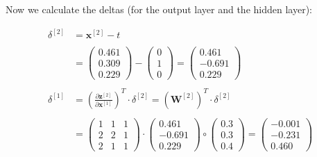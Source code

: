 \documentclass[12pt]{article}
\begin{document}
\begin{enumerate}
\newpage
Now we calculate the deltas (for the output layer and the hidden layer):

\begin{equation*}
    \begin{aligned}
        \delta^{[2]} &= \mathbf{x}^{[2]} - t\\
        \\
        &= \begin{pmatrix} 
            0.461 \\
            0.309 \\
            0.229
            \end{pmatrix} -
            \begin{pmatrix} 
            0\\     
            1\\
            0 
            \end{pmatrix} = \begin{pmatrix}
            0.461 \\
            -0.691 \\
            0.229 
            \end{pmatrix}\\
        \\
        \delta^{[1]} &= \left(\frac{\partial \mathbf{z}^{[2]}}{\partial \mathbf{x}^{[1]}}\right)^T \cdot \delta^{[2]} = \left(\mathbf{W}^{[2]}\right)^T \cdot \delta^{[2]}\\
        \\
        &= \begin{pmatrix}
            1 & 1 & 1\\
            2 & 2 & 1\\
            2 & 1 & 1
        \end{pmatrix} \cdot \begin{pmatrix}
            0.461 \\
            -0.691 \\
            0.229 
        \end{pmatrix} \circ \begin{pmatrix}
            0.3\\
            0.3\\
            0.4
        \end{pmatrix} = \begin{pmatrix}
            -0.001\\
            -0.231\\
            0.460
        \end{pmatrix} 
    \end{aligned}
\end{equation*}


\end{enumerate}
\end{document}
